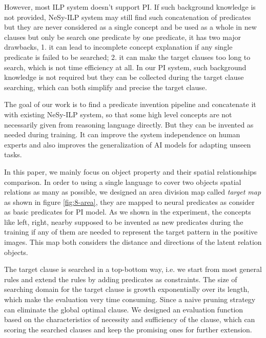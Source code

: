 \documentclass[
]{ceurart}
\begin{document}
However, most ILP system doesn't support PI. If such background knowledge is not provided, NeSy-ILP system may still find such concatenation of predicates but they are never considered as a single concept and be used as a whole in new clauses but only be search one predicate by one predicate, it has two major drawbacks, 1. it can lead to incomplete concept explanation if any single predicate is failed to be searched; 2. it can make the target clauses too long to search, which is not time efficiency at all.
In our PI system, such background knowledge is not required but they can be collected during the target clause searching, which can both simplify and precise the target clause.

The goal of our work is to find a predicate invention pipeline and concatenate it with existing NeSy-ILP system, so that some high level concepts are not necessarily given from reasoning language directly. But they can be invented as needed during training. It can improve the system independence on human experts and also improves the generalization of AI models for adapting unseen tasks. 

In this paper, we mainly focus on object property and their spatial relationships comparison. In order to using a single language to cover two objects spatial relations as many as possible, we designed an area division map called \textit{target map} as shown in figure \ref{fig:8-area}, they are mapped to neural predicates as consider as basic predicates for PI model. As we shown in the experiment, the concepts like left, right, nearby supposed to be invented as new predicates during the training if any of them are needed to represent the target pattern in the positive images.  This map both considers the distance and directions of the latent relation objects. 

The target clause is searched in a top-bottom way, i.e. we start from most general rules and extend the rules by adding predicates as constraints. The size of searching domain for the target clause is growth exponentially over its length, which make the evaluation very time consuming. Since a naive pruning strategy can eliminate the global optimal clause. 
We designed an evaluation function based on the characteristics of necessity and sufficiency of the clause, which can scoring the searched clauses and keep the promising ones for further extension.
\end{document}
